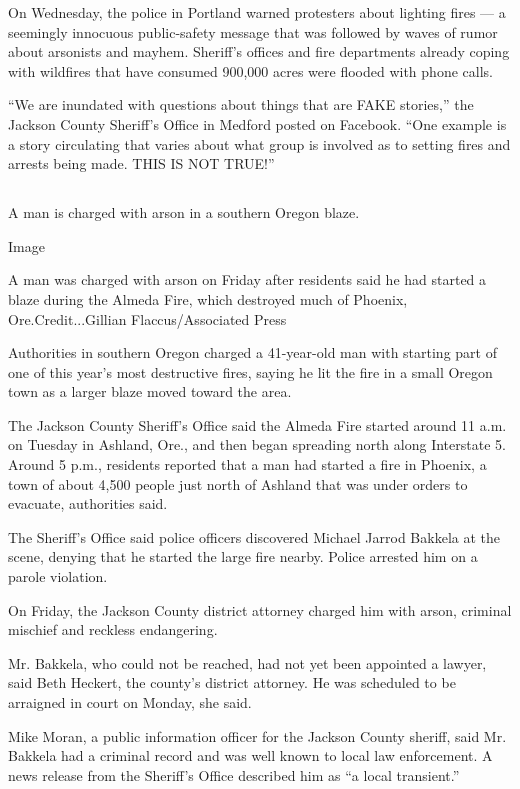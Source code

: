 On Wednesday, the police in Portland warned protesters about lighting
fires --- a seemingly innocuous public-safety message that was followed
by waves of rumor about arsonists and mayhem. Sheriff's offices and fire
departments already coping with wildfires that have consumed 900,000
acres were flooded with phone calls.

``We are inundated with questions about things that are FAKE stories,''
the Jackson County Sheriff's Office in Medford posted on Facebook. ``One
example is a story circulating that varies about what group is involved
as to setting fires and arrests being made. THIS IS NOT TRUE!''

\hypertarget{-4}{%
\subsection{}\label{-4}}

A man is charged with arson in a southern Oregon blaze.

Image

A man was charged with arson on Friday after residents said he had
started a blaze during the Almeda Fire, which destroyed much of Phoenix,
Ore.Credit...Gillian Flaccus/Associated Press

Authorities in southern Oregon charged a 41-year-old man with starting
part of one of this year's most destructive fires, saying he lit the
fire in a small Oregon town as a larger blaze moved toward the area.

The Jackson County Sheriff's Office said the Almeda Fire started around
11 a.m. on Tuesday in Ashland, Ore., and then began spreading north
along Interstate 5. Around 5 p.m., residents reported that a man had
started a fire in Phoenix, a town of about 4,500 people just north of
Ashland that was under orders to evacuate, authorities said.

The Sheriff's Office said police officers discovered Michael Jarrod
Bakkela at the scene, denying that he started the large fire nearby.
Police arrested him on a parole violation.

On Friday, the Jackson County district attorney charged him with arson,
criminal mischief and reckless endangering.

Mr. Bakkela, who could not be reached, had not yet been appointed a
lawyer, said Beth Heckert, the county's district attorney. He was
scheduled to be arraigned in court on Monday, she said.

Mike Moran, a public information officer for the Jackson County sheriff,
said Mr. Bakkela had a criminal record and was well known to local law
enforcement. A news release from the Sheriff's Office described him as
``a local transient.''

